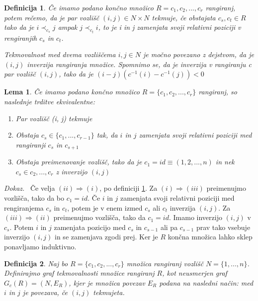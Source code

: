 \documentclass[a4paper, 12pt]{book}
\newtheorem{definicija}{Definicija}[chapter]
\newtheorem{lema}{Lema}[chapter]
\newenvironment{dokaz}{\emph{Dokaz.}\ }{\hspace{\fill}{$\Box$}}
\begin{document}
\begin{definicija}
\label{def_tekmovalnosti}
    Če imamo podano končno množico $R = {c_1, c_2, ..., c_r}$ rangiranj, potem rečemo, da je par vozlišč $(i, j) \in N \times N$ tekmuje, če obstajata $c_s, c_t \in R$ tako da je $i \prec_{c_s} j$ ampak $j \prec_{c_t} i$, to je i in j zamenjata svoji relativni poziciji v rengiranjih $c_s$ in $c_t$.

    Tekmovalnost med dvema vozliščema $i, j \in N$ je močno povezano z dejstvom, da je $(i, j)$ inverzija rangiranja množice. Spomnimo se, da je inverzija v rangiranju c par vozlišč $(i, j)$, tako da je $(i-j)(c^{-1}(i) - c^{-1}(j)) < 0$
\end{definicija}

\begin{lema}
    Če imamo podano končno množico $R = \{ c_1, c_2, ..., c_r \}$ rangiranj, so naslednje trditve ekvivalentne:
    \begin{enumerate}[label=(\roman*)]
        \item Par vozlišč (i, j) tekmuje
        \item Obstaja $c_s \in \{ c_1, ..., c_{r-1} \}$ tak, da $i$ in $j$ zamenjata svoji relativni poziciji med rangiranji $c_s$ in $c_{s+1}$
        \item Obstaja preimenovanje vozlišč, tako da je $c_1 = id \equiv (1, 2, ..., n)$ in nek $c_s \in {c_2, ..., c_r}$ z inverzijo $(i, j)$
    \end{enumerate}
\end{lema}
\begin{dokaz}
    Če velja $(ii) \Rightarrow (i)$, po definiciji \ref{def_tekmovalnosti}. Za $(i) \Rightarrow (iii)$ preimenujmo vozlišča, tako da bo $c_1 = id$. Če $i$ in $j$ zamenjata svoji relativni poziciji med rengiranjema $c_s$ in $c_t$, potem je v enem izmed $c_s$ ali $c_t$ inverzija $(i, j)$. Za $(iii) \Rightarrow (ii)$ preimenujmo vozlišča, tako da $c_1 = id$. Imamo inverzijo $(i, j)$ v $c_s$. Potem $i$ in $j$ zamenjata pozicijo med $c_s$ in $c_{s-1}$ ali pa $c_{s-1}$ prav tako vsebuje inverzijo $(i, j)$ in se zamenjava zgodi prej. Ker je $R$ končna množica lahko sklep ponavljamo induktivno.
\end{dokaz}

\begin{definicija}
    Naj bo $R = \{ c_1, c_2, ..., c_r \}$ množica rangiranj vozlišč $N = \{ 1, ..., n \}$. Definirajmo graf tekmovalnosti množice rangiranj $R$, kot neusmerjen graf $G_c(R) = (N, E_R)$, kjer je množica povezav $E_R$ podana na nasledni način: med $i$ in $j$ je povezava, če $(i, j)$ tekmujeta.
\end{definicija}
\end{document}
